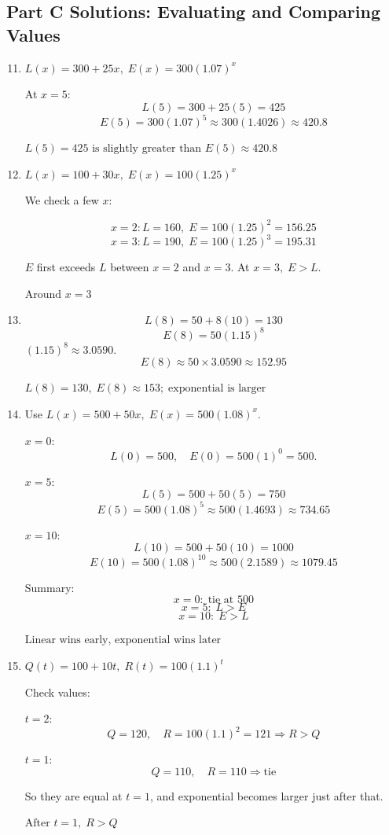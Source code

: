 \documentclass[14pt]{extarticle}
\begin{document}
\subsection*{Part C Solutions: Evaluating and Comparing Values}
\begin{enumerate}
  \setcounter{enumi}{10}
  \item \(L(x) = 300 + 25x,\; E(x) = 300(1.07)^x\)

  At \(x = 5\):
  \[
  L(5) = 300 + 25(5) = 425
  \]
  \[
  E(5) = 300(1.07)^5 \approx 300(1.4026) \approx 420.8
  \]

  \(\boxed{L(5)=425 \text{ is slightly greater than } E(5)\approx 420.8}\)

  \item \(L(x) = 100 + 30x,\; E(x) = 100(1.25)^x\)

  We check a few \(x\):

  \[
  x=2: L=160,\; E=100(1.25)^2=156.25
  \]
  \[
  x=3: L=190,\; E=100(1.25)^3=195.31
  \]

  \(E\) first exceeds \(L\) between \(x=2\) and \(x=3\). At \(x=3,\; E > L.\)

  \(\boxed{\text{Around } x=3}\)

  \item
  \[
  L(8) = 50 + 8(10) = 130
  \]
  \[
  E(8) = 50(1.15)^8
  \]
  \((1.15)^8 \approx 3.0590.\)
  \[
  E(8) \approx 50 \times 3.0590 \approx 152.95
  \]

  \(\boxed{L(8)=130,\; E(8)\approx 153;\; \text{exponential is larger}}\)

  \item Use \(L(x)=500+50x,\; E(x)=500(1.08)^x\).

  \(x=0:\)
  \[
  L(0)=500,\quad E(0)=500(1)^0=500.
  \]

  \(x=5:\)
  \[
  L(5)=500+50(5)=750
  \]
  \[
  E(5)=500(1.08)^5 \approx 500(1.4693)\approx 734.65
  \]

  \(x=10:\)
  \[
  L(10)=500+50(10)=1000
  \]
  \[
  E(10)=500(1.08)^{10} \approx 500(2.1589)\approx 1079.45
  \]

  Summary:
  \[
  x=0:\; \text{tie at 500}
  \]
  \[
  x=5:\; L > E
  \]
  \[
  x=10:\; E > L
  \]

  \(\boxed{\text{Linear wins early, exponential wins later}}\)

  \item \(Q(t) = 100 + 10t,\; R(t) = 100(1.1)^t\)

  Check values:

  \(t=2:\)
  \[
  Q=120,\quad R=100(1.1)^2=121
  \Rightarrow R>Q
  \]

  \(t=1:\)
  \[
  Q=110,\quad R=110
  \Rightarrow \text{tie}
  \]

  So they are equal at \(t=1\), and exponential becomes larger just after that.

  \(\boxed{\text{After } t=1,\; R>Q}\)
\end{enumerate}
\end{document}
